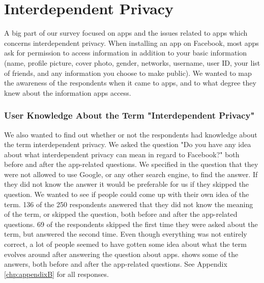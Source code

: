 \section{Interdependent Privacy}

A big part of our survey focused on apps and the issues related to apps which concerns interdependent privacy. When installing an app on Facebook, most apps ask for permission to access information in addition to your basic information (name, profile picture, cover photo, gender, networks, username, user ID, your list of friends, and any information you choose to make public). We wanted to map the awareness of the respondents when it came to apps, and to what degree they knew about the information apps access. 

\subsubsection{User Knowledge About the Term "Interdependent Privacy"}
We also wanted to find out whether or not the respondents had knowledge about the term interdependent privacy. We asked the question "Do you have any idea about what interdependent privacy can mean in regard to Facebook?" both before and after the app-related questions. We specified in the question that they were not allowed to use Google, or any other search engine, to find the answer. If they did not know the answer it would be preferable for us if they skipped the question. We wanted to see if people could come up with their own idea of the term. 136 of the 250 respondents answered that they did not know the meaning of the term, or skipped the question, both before and after the app-related questions. 69 of the respondents skipped the first time they were asked about the term, but answered the second time. Even though everything was not entirely correct, a lot of people seemed to have gotten some idea about what the term evolves around after answering the question about apps.  shows some of the answers, both before and after the app-related questions. See Appendix \ref{chp:appendixB} for all responses.   


